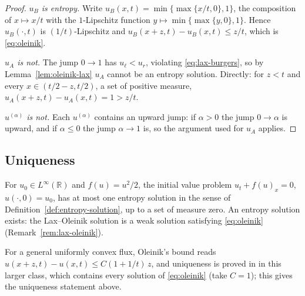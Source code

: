 \begin{proof}
\emph{$u_B$ is entropy.} Write $u_B(x,t)=\min\{\max\{x/t,0\},1\}$, the
composition of $x\mapsto x/t$ with the $1$-Lipschitz function
$y\mapsto\min\{\max\{y,0\},1\}$. Hence $u_B(\cdot,t)$ is $(1/t)$-Lipschitz
and $u_B(x+z,t)-u_B(x,t)\le z/t$, which is \eqref{eq:oleinik}.

\emph{$u_A$ is not.} The jump $0\to1$ has $u_\ell<u_r$, violating
\eqref{eq:lax-burgers}, so by Lemma~\ref{lem:oleinik-lax} $u_A$ cannot be
an entropy solution. Directly: for $z<t$ and every $x\in(t/2-z,t/2)$, a set of positive measure,
$u_A(x+z,t)-u_A(x,t)=1>z/t$.

\emph{$u^{(\alpha)}$ is not.} Each $u^{(\alpha)}$ contains an upward jump: if
$\alpha>0$ the jump $0\to\alpha$ is upward, and if $\alpha\le0$ the jump
$\alpha\to1$ is, so the argument used for $u_A$ applies.
\end{proof}

\subsection{Uniqueness}
\label{subsec:entropy-uniqueness}

\begin{theorem}
\label{thm:oleinik-uniqueness}
For $u_0 \in L^\infty(\mathbb{R})$ and $f(u)=u^2/2$, the initial value
problem $u_t+f(u)_x=0$, $u(\cdot,0)=u_0$, has at most one entropy solution in
the sense of Definition~\ref{def:entropy-solution}, up to a set of measure
zero. An entropy solution exists: the Lax--Oleinik solution
\cite[\S3.4.2]{evans2010} is a weak solution satisfying
\eqref{eq:oleinik} (Remark~\ref{rem:lax-oleinik}).
\end{theorem}

For a general uniformly convex flux, Oleinik's bound reads
$u(x+z,t)-u(x,t)\le C(1+1/t)\,z$, and uniqueness is proved in
\cite[\S3.4.3]{evans2010} in this larger class, which contains every solution of
\eqref{eq:oleinik} (take $C=1$); this gives the uniqueness statement above.

